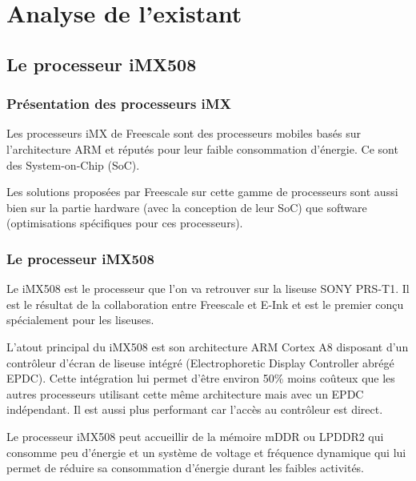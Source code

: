 \chapter{Analyse de l'existant}

\section{Le processeur iMX508}

\subsection{Présentation des processeurs iMX}

Les processeurs iMX de Freescale sont des processeurs mobiles basés sur l'architecture ARM et réputés pour leur faible consommation d'énergie. Ce sont des System-on-Chip (SoC).


Les solutions proposées par Freescale sur cette gamme de processeurs sont aussi bien sur la partie hardware (avec la conception de leur SoC) que software (optimisations spécifiques pour ces processeurs).

\newpage

\subsection{Le processeur iMX508}

Le iMX508 est le processeur que l'on va retrouver sur la liseuse SONY PRS-T1. Il est le résultat de la collaboration entre Freescale et E-Ink et est le premier conçu spécialement pour les liseuses. 

L'atout principal du iMX508 est son architecture ARM Cortex A8 disposant d'un contrôleur d'écran de liseuse intégré (Electrophoretic Display Controller abrégé EPDC). Cette intégration lui permet d'être environ 50\% moins coûteux que les autres processeurs utilisant cette même architecture mais avec un EPDC indépendant. Il est aussi plus performant car l'accès au contrôleur est direct.

Le processeur iMX508 peut accueillir de la mémoire mDDR ou LPDDR2 qui consomme peu d'énergie et un système de voltage et fréquence dynamique qui lui permet de réduire sa consommation d'énergie durant les faibles activités.

